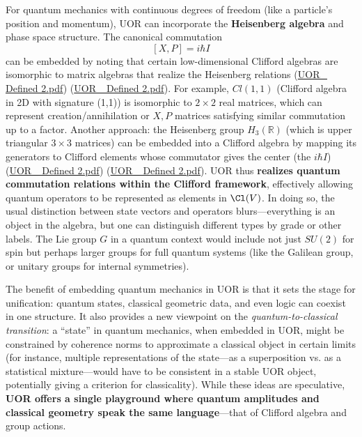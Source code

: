 \documentclass[12pt]{article}
\begin{document}
For quantum mechanics with continuous degrees of freedom (like a particle’s position and momentum), UOR can incorporate the \textbf{Heisenberg algebra} and phase space structure. The canonical commutation 
\[
[X, P] = i\hbar I
\]
can be embedded by noting that certain low-dimensional Clifford algebras are isomorphic to matrix algebras that realize the Heisenberg relations (\href{file://file-TBF3nHDaRR5QeVMmwCFYkp#:~:text=canonical%20position%E2%80%93momentum%20algebra%2C%20one%20can,via%20an%20isomorphism%20to%20a}{UOR\_ Defined 2.pdf}) (\href{file://file-TBF3nHDaRR5QeVMmwCFYkp#:~:text=embedded%20into%20a%20suitable%20finite,within%20the%20Clifford%20algebra%20framework}{UOR\_ Defined 2.pdf}). For example, $Cl(1,1)$ (Clifford algebra in 2D with signature (1,1)) is isomorphic to $2\times2$ real matrices, which can represent creation/annihilation or $X,P$ matrices satisfying similar commutation up to a factor. Another approach: the Heisenberg group $H_3(\mathbb{R})$ (which is upper triangular $3\times3$ matrices) can be embedded into a Clifford algebra by mapping its generators to Clifford elements whose commutator gives the center (the $i\hbar I$) (\href{file://file-TBF3nHDaRR5QeVMmwCFYkp#:~:text=Heisenberg%20algebra,realizing%20the%20central%20identity%20element}{UOR\_ Defined 2.pdf}) (\href{file://file-TBF3nHDaRR5QeVMmwCFYkp#:~:text=embedded%20into%20a%20suitable%20finite,within%20the%20Clifford%20algebra%20framework}{UOR\_ Defined 2.pdf}). UOR thus \textbf{realizes quantum commutation relations within the Clifford framework}, effectively allowing quantum operators to be represented as elements in $\Cl(V)$. In doing so, the usual distinction between state vectors and operators blurs---everything is an object in the algebra, but one can distinguish different types by grade or other labels. The Lie group $G$ in a quantum context would include not just $SU(2)$ for spin but perhaps larger groups for full quantum systems (like the Galilean group, or unitary groups for internal symmetries).

\medskip

The benefit of embedding quantum mechanics in UOR is that it sets the stage for unification: quantum states, classical geometric data, and even logic can coexist in one structure. It also provides a new viewpoint on the \emph{quantum-to-classical transition}: a “state” in quantum mechanics, when embedded in UOR, might be constrained by coherence norms to approximate a classical object in certain limits (for instance, multiple representations of the state---as a superposition vs. as a statistical mixture---would have to be consistent in a stable UOR object, potentially giving a criterion for classicality). While these ideas are speculative, \textbf{UOR offers a single playground where quantum amplitudes and classical geometry speak the same language}---that of Clifford algebra and group actions.
\end{document}
